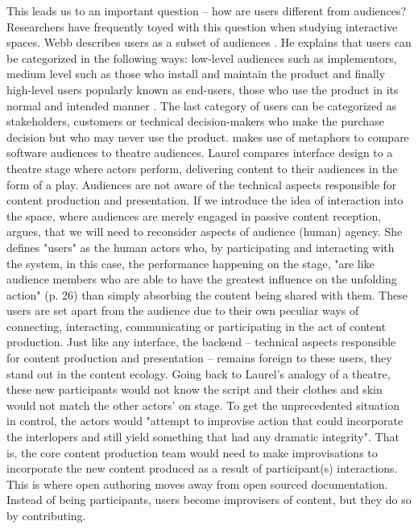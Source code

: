 This leads us to an important question – how are users different from audiences? Researchers have frequently toyed with this question when studying interactive spaces. Webb describes users as a subset of audiences \cite{webb2013techniques}. He explains that users can be categorized in the following ways: low-level audiences such as implementors, medium level such as those who install and maintain the product and finally high-level users popularly known as end-users, those who use the product in its normal and intended manner \cite{webb2013techniques}. The last category of users can be categorized as stakeholders, customers or technical decision-makers who make the purchase decision but who may never use the product. \textcite{laurel2013computers} makes use of metaphors to compare software audiences to theatre audiences. Laurel compares interface design to a theatre stage where actors perform, delivering content to their audiences in the form of a play. Audiences are not aware of the technical aspects responsible for content production and presentation. If we introduce the idea of interaction into the space, where audiences are merely engaged in passive content reception, \textcite{laurel2013computers} argues, that we will need to reconsider aspects of audience (human) agency. She defines "users" as the human actors who, by participating and interacting with the system, in this case, the performance happening on the stage, "are like audience members who are able to have the greatest influence on the unfolding action" (p. 26) than simply absorbing the content being shared with them. These users are set apart from the audience due to their own peculiar ways of connecting, interacting, communicating or participating in the act of content production. Just like any interface, the backend – technical aspects responsible for content production and presentation – remains foreign to these users, they stand out in the content ecology. Going back to Laurel's analogy of a theatre, these new participants would not know the script and their clothes and skin would not match the other actors' on stage. To get the unprecedented situation in control, the actors would "attempt to improvise action that could incorporate the interlopers and still yield something that had any dramatic integrity". That is, the core content production team would need to make improvisations to incorporate the new content produced as a result of participant(s) interactions. This is where open authoring moves away from open sourced documentation. Instead of being participants, users become improvisers of content, but they do so by contributing.  

